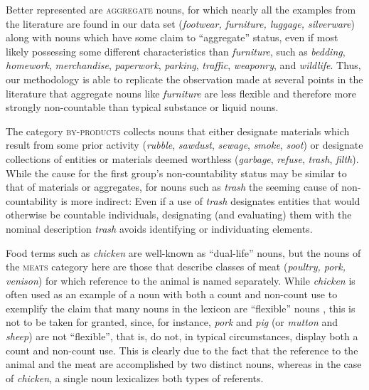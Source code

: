 \documentclass[output=paper]{langscibook}
\begin{document}
Better represented are \textsc{aggregate} nouns, for which nearly all the examples from the literature are found in our data set (\textit{footwear, furniture,  luggage, silverware}) along with nouns which have some claim to ``aggregate'' status, even if most likely possessing some different characteristics than \textit{furniture}, such as  \textit{bedding}, \textit{homework}, \textit{merchandise}, \textit{paperwork}, \textit{parking}, \textit{traffic}, \textit{weaponry},  and \textit{wildlife}.  Thus, our methodology is able to replicate the observation made at several points in the literature that aggregate nouns like \textit{furniture} are less flexible and therefore more strongly non-countable than typical substance or liquid nouns.%







\begin{sloppypar}
The  category \textsc{by-products} collects nouns that either  designate materials which result from some prior activity  (\textit{rubble}, \textit{sawdust}, \textit{sewage}, \textit{smoke}, \textit{soot}) or designate collections of entities or materials deemed worthless (\textit{garbage}, \textit{refuse},  \textit{trash}, \textit{filth}). While the cause for the first group's non-countability status may be similar to that of materials or aggregates, for nouns such as \textit{trash} the seeming cause of non-countability is more indirect:  Even if a use of \textit{trash} designates entities that would otherwise be countable individuals, designating (and evaluating) them with the nominal description \textit{trash} avoids identifying or individuating elements.
\end{sloppypar}

Food terms such as \textit{chicken} are well-known as ``dual-life'' nouns, but the nouns of the  \textsc{meats} category here are those that describe classes of meat (\textit{poultry, pork, venison}) for which reference to the animal is named separately.  While \textit{chicken} is often used as an example of a noun with both a count and non-count use to exemplify the claim that many nouns in the lexicon are ``flexible'' nouns \citep[e.g.][241]{Bale2009}, this is not to be taken for granted, since, for instance, \textit{pork} and \textit{pig} (or \textit{mutton} and \textit{sheep}) are not ``flexible'', that is, do not, in typical circumstances, display both a count and non-count use.  This is clearly due to the fact that the reference to the animal and the meat are accomplished by two distinct nouns, whereas in the case of  \textit{chicken}, a single noun lexicalizes both types of referents.
\end{document}

